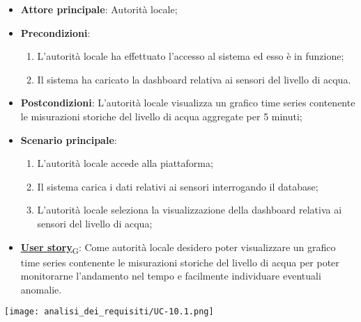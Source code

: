 \begin{itemize}
	\item \textbf{Attore principale}: Autorità locale;
	\item \textbf{Precondizioni}:
	      \begin{enumerate}
		      \item L'autorità locale ha effettuato l'accesso al sistema ed esso è in funzione;
		      \item Il sistema ha caricato la dashboard relativa ai sensori del livello di acqua.
	      \end{enumerate}
	\item \textbf{Postcondizioni}: L'autorità locale visualizza un grafico time series contenente le misurazioni storiche
	      del livello di acqua aggregate per 5 minuti;
	\item \textbf{Scenario principale}:
	      \begin{enumerate}
		      \item L'autorità locale accede alla piattaforma;
		      \item Il sistema carica i dati relativi ai sensori interrogando il database;
		      \item L'autorità locale seleziona la visualizzazione della dashboard relativa ai sensori del livello di acqua;
	      \end{enumerate}
	\item \href{https://7last.github.io/docs/rtb/documentazione-interna/glossario\#user-story}{\textbf{User story}\textsubscript{G}}:
	      Come autorità locale desidero poter visualizzare un grafico time series contenente le misurazioni storiche
	      del livello di acqua per poter monitorarne l'andamento nel tempo e facilmente individuare eventuali anomalie.
\end{itemize}
\begin{center}
	\texttt{[image: analisi\_dei\_requisiti/UC-10.1.png]}
\end{center}

